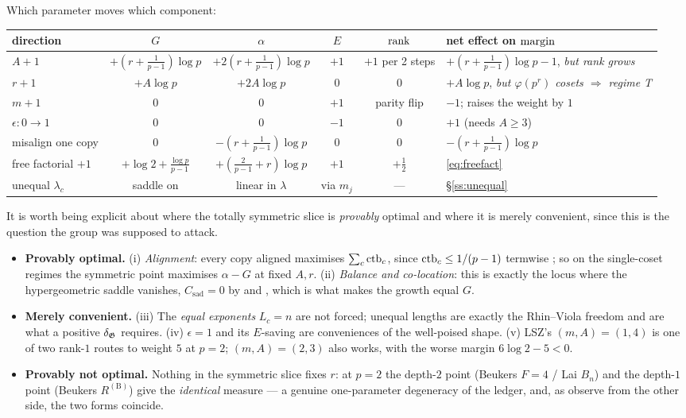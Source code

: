 Which parameter moves which component:
\begin{center}
\scriptsize\setlength{\tabcolsep}{3.5pt}
\begin{tabular}{lccccl}
\toprule
direction & $G$ & $\alpha$ & $E$ & $\operatorname{rank}$ & net effect on $\operatorname{margin}$\\
\midrule
$A\mathbin{+}1$ & $+(r+\tfrac1{p-1})\log p$ & $+2(r+\tfrac1{p-1})\log p$ & $+1$ & $+1$ per 2 steps
  & $+(r+\tfrac1{p-1})\log p-1$, \emph{but rank grows}\\
$r\mathbin{+}1$ & $+A\log p$ & $+2A\log p$ & $0$ & $0$
  & $+A\log p$, \emph{but $\varphi(p^r)$ cosets $\Rightarrow$ regime T}\\
$m\mathbin{+}1$ & $0$ & $0$ & $+1$ & parity flip & $-1$; raises the weight by $1$\\
$\epsilon:0\to1$ & $0$ & $0$ & $-1$ & $0$ & $+1$ (needs $A\ge3$)\\
misalign one copy & $0$ & $-(r+\tfrac1{p-1})\log p$ & $0$ & $0$ & $-(r+\tfrac1{p-1})\log p$\\
free factorial $+1$ & $+\log2+\tfrac{\log p}{p-1}$ & $+(\tfrac2{p-1}+r)\log p$ & $+1$ & $+\tfrac12$
  & \eqref{eq:freefact}\\
unequal $\lambda_c$ & saddle on & linear in $\lambda$ & via $m_j$ & --- & \S\ref{ss:unequal}\\
\bottomrule
\end{tabular}
\end{center}

It is worth being explicit about where the totally symmetric slice is \emph{provably}
optimal and where it is merely convenient, since this is the question the group was supposed
to attack.

\begin{itemize}[leftmargin=1.6em,itemsep=3pt]
\item \textbf{Provably optimal.} (i) \emph{Alignment}: every copy aligned maximises
      $\sum_c\operatorname{ctb}_c$, since $\operatorname{ctb}_c\le1/(p-1)$ termwise \PROVED{}; so on the single-coset
      regimes the symmetric point maximises $\alpha-G$ at fixed $A,r$. (ii)
      \emph{Balance and co-location}: this is exactly the locus where the hypergeometric
      saddle vanishes, $C_{\mathrm{sad}}=0$ \PROVED{} by
      \cite[Prop.~11.1(3)]{Beukers2008} and \cite[Lemma 20]{LSZ2025}, which is what makes
      the growth equal $G$.
\item \textbf{Merely convenient.} (iii) The \emph{equal exponents} $L_c=n$ are not forced;
      unequal lengths are exactly the Rhin--Viola freedom and are what a positive $\delta_{\mathfrak{G}}$
      requires. (iv) $\epsilon=1$ and its $E$-saving are conveniences of the well-poised
      shape. (v) LSZ's $(m,A)=(1,4)$ is one of two rank-$1$ routes to weight $5$ at $p=2$;
      $(m,A)=(2,3)$ also works, with the worse margin $6\log2-5<0$.
\item \textbf{Provably not optimal.} Nothing in the symmetric slice fixes $r$: at $p=2$ the
      depth-$2$ point (Beukers $F=4$ / Lai $B_n$) and the depth-$1$ point (Beukers
      $R^{(\mathrm B)}$) give the \emph{identical} measure --- a genuine one-parameter
      degeneracy of the ledger, and, as \cite[Final remarks]{LSZ2025} observe from the other
      side, the two forms coincide.
\end{itemize}

